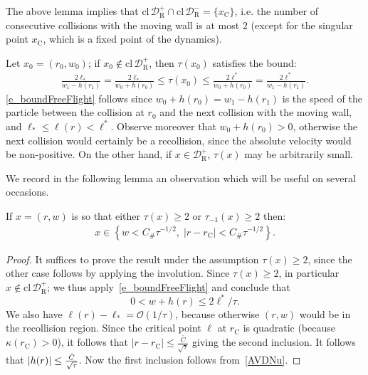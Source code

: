 \documentclass[AHL, Unicode, longabstracts,published]{cedram}
\newcommand{\nin}{\not\in}
\newcommand{\ct}{r}
\newcommand{\fft}{\tau}
\newcommand{\curv}{\kappa}
\newcommand{\cl}[1]{\mathrm{cl}\,#1}
\newcommand{\crit}{\mathrm{C}}
\newcommand{\ctc}{\ct_\crit}
\newcommand{\xc}{x_\crit}
\newcommand{\cO}{\mathcal{O}}
\newcommand{\cell}{\mathcal{D}}
\newcommand{\privateu}[1]{#1^*}
\newcommand{\privatel}[1]{#1_*}
\newcommand{\slope}{h}
\newcommand{\ellu}{\privateu{\ell}}
\newcommand{\elll}{\privatel{\ell}}
\newcommand{\recoPrivate}{\mathrm{R}}
\newcommand{\reco}{{\cell^-_{\recoPrivate}}}
\newcommand{\backReco}{{\cell^+_{\recoPrivate}}}
\newcommand{\Const}{C_\#}
\newcommand{\clo}{\text{cl}\,}
\let\oldhat\hat
\renewcommand*{\hat}[1]{\mathchoice{\widehat{#1}}{\widehat{#1}}{\oldhat{#1}}{\oldhat{#1}}}
\begin{document}
\begin{rema}\label{r_thereCanBeOnlyOne}
The above lemma implies that $\clo\backReco\cap\clo\reco=\{\xc\}$, i.e. the number of consecutive collisions with the moving wall is at most $2$ (except for the singular point $\xc$, which is a fixed point of the dynamics).
\end{rema}

\begin{rema}\label{r_boundFreeFlight}
Let $x_0=(r_0,w_0)$; if $x_0\not\in\clo\backReco$, then $\fft(x_0)$ satisfies the bound:
\begin{align}\label{e_boundFreeFlight}
\frac{2\elll}{w_1-\slope(\ct_1)} = \frac{2\elll}{w_0+\slope(\ct_0)} \leq \fft(x_0) \leq
\frac{2\ellu}{w_0+\slope(\ct_0)} = \frac{2\ellu}{w_1-\slope(\ct_1)}.
\end{align}
\eqref{e_boundFreeFlight} follows since $w_0+h(r_0)=w_1-h(r_1)$ is the speed of the particle between the collision at $\ct_{0}$ and the next collision with the moving wall, and $\elll\le\ell(\ct) < \ellu$. Observe moreover that $w_0+h(r_0)>0$, otherwise the next collision would certainly be a recollision, since the absolute velocity would be non-positive. On the other hand, if $x\in\backReco$, $\fft(x)$ may be arbitrarily small.
\end{rema}

We record in the following lemma an observation which will be useful on several occasions.
\begin{lemm}\label{lem:geometry}
If $x = (\ct,w)$ is so that either $\fft(x) \geq 2$ or $\fft_{-1}(x)\geq 2$ then:
\begin{align*}
x \in \left\{w < \Const \tau^{-1/2},\; |\ct-\ctc|< \Const
\tau^{-1/2} \right\}.
\end{align*}
\end{lemm}
\begin{proof}
It suffices to prove the result under the assumption $\tau(x)\geq 2$, since the other case follows by applying the involution. Since $\tau(x)\ge 2$, in particular $x\nin\cl\backReco$; we thus apply~\eqref{e_boundFreeFlight} and conclude that
\begin{equation}\label{AVDNu}
0<w+h(\ct) \le 2\ellu/\tau.
\end{equation}
We also have $\ell(\ct)-\elll = \cO(1/\tau)$, because otherwise $(\ct, w)$ would be in the recollision region. Since the critical point $\ell$ at $\ctc$ is quadratic (because $\curv(\ctc) > 0$), it follows that $|\ct-\ctc|\leq \frac{\bar C}{\sqrt{\tau}}$ giving the second inclusion. It follows that $|h(\ct)|\leq \frac{\hat C}{\sqrt{\tau}}$. Now the first inclusion follows from~\eqref{AVDNu}.
\end{proof}
\end{document}
